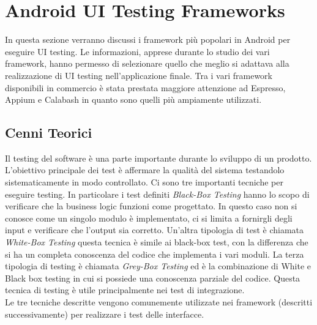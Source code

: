 \documentclass[12pt]{report}
\begin{document}
\section{Android UI Testing Frameworks}

In questa sezione verranno discussi i framework più popolari in Android per eseguire UI testing. Le informazioni, apprese durante lo studio dei vari framework, hanno permesso di selezionare quello che meglio si adattava alla realizzazione di UI testing nell'applicazione finale. Tra i vari framework disponibili in commercio è stata prestata maggiore attenzione ad Espresso, Appium e Calabash in quanto sono quelli più ampiamente utilizzati.\cite{TestDiffusi}
\subsection{Cenni Teorici}
Il testing del software è una parte importante durante lo sviluppo di un prodotto. L'obiettivo principale dei test è affermare la qualità del sistema testandolo sistematicamente in modo controllato. Ci sono tre importanti tecniche per eseguire testing\cite{articleTesting}. In particolare i test definiti \textit{Black-Box Testing} hanno lo scopo di verificare che la business logic funzioni come progettato. In questo caso non si conosce come un singolo modulo è implementato, ci si limita a fornirgli degli input e verificare che l'output sia corretto. Un'altra tipologia di test è chiamata \textit{White-Box Testing} questa tecnica è simile ai black-box test, con la differenza che si ha un completa conoscenza del codice che implementa i vari moduli. La terza tipologia di testing è chiamata \textit{Grey-Box Testing} ed è la combinazione di White e Black box testing in cui si possiede una conoscenza parziale del codice. Questa tecnica di testing è utile principalmente nei test di integrazione.\\
Le tre tecniche descritte vengono comunemente utilizzate nei framework (descritti successivamente) per realizzare i test delle interfacce. %
\end{document}
